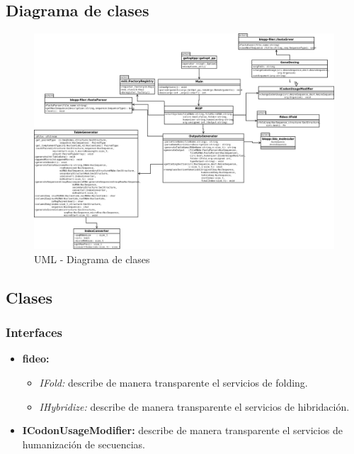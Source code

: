 \documentclass[12pt,a4paper,spanish]{article}
\begin{document}
\vskip 5cm

\subsection{Diagrama de clases}
\begin{figure}
  \centering
  \includegraphics[scale=0.35, angle=90]{image/ClassDiagram.png}  
  \caption{UML - Diagrama de clases}
  \label{mensajes}
\end{figure}

\subsection{Clases}
\subsubsection{Interfaces}
\begin{itemize}
    \item \textbf{fideo:}
        \begin{itemize}
            \item \emph{IFold:} describe de manera transparente el servicios de folding.
            \item \emph{IHybridize:} describe de manera transparente el servicios de hibridación.
        \end{itemize}
    \item \textbf{ICodonUsageModifier:} describe de manera transparente el servicios de humanización de
                                        secuencias.
\end{itemize}
\end{document}
